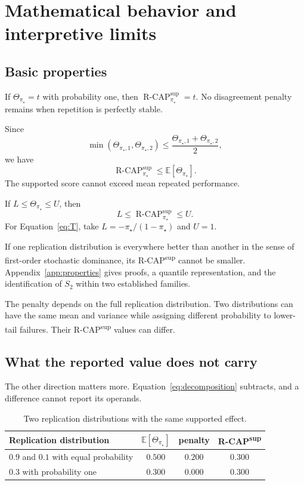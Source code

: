 \documentclass[11pt]{article}
\newcommand{\E}{\mathbb{E}}
\newcommand{\RCAP}{\operatorname{R\text{-}CAP}^{\mathrm{sup}}_{\pi_\star}}
\theoremstyle{remark}
\begin{document}
\section{Mathematical behavior and interpretive limits}
\label{sec:properties}

\subsection{Basic properties}

If $\Theta_{\pi_\star}=t$ with probability one, then $\RCAP=t$. No disagreement penalty remains when repetition is perfectly stable.

Since
\[
\min(\Theta_{\pi_\star,1},\Theta_{\pi_\star,2})
\leq
\frac{\Theta_{\pi_\star,1}+\Theta_{\pi_\star,2}}{2},
\]
we have
\[
\RCAP\leq\E[\Theta_{\pi_\star}].
\]
The supported score cannot exceed mean repeated performance.

If $L\leq\Theta_{\pi_\star}\leq U$, then
\[
L\leq\RCAP\leq U.
\]
For Equation~\eqref{eq:T}, take $L=-\pi_\star/(1-\pi_\star)$ and $U=1$.

If one replication distribution is everywhere better than another in the sense of first-order stochastic dominance, its R-CAP\textsuperscript{sup} cannot be smaller. Appendix~\ref{app:properties} gives proofs, a quantile representation, and the identification of $S_2$ within two established families.

The penalty depends on the full replication distribution. Two distributions can have the same mean and variance while assigning different probability to lower-tail failures. Their R-CAP\textsuperscript{sup} values can differ.

\subsection{What the reported value does not carry}
\label{sec:collision}

The other direction matters more. Equation~\eqref{eq:decomposition} subtracts, and a difference cannot report its operands.

\begin{table}[ht]
\centering
\caption{Two replication distributions with the same supported effect.}
\label{tab:collision}
\begin{tabular}{@{}lccc@{}}
\toprule
Replication distribution & $\E[\Theta_{\pi_\star}]$ & penalty & R-CAP\textsuperscript{sup} \\
\midrule
$0.9$ and $0.1$ with equal probability & $0.500$ & $0.200$ & $0.300$ \\
$0.3$ with probability one & $0.300$ & $0.000$ & $0.300$ \\
\bottomrule
\end{tabular}
\end{table}
\end{document}
